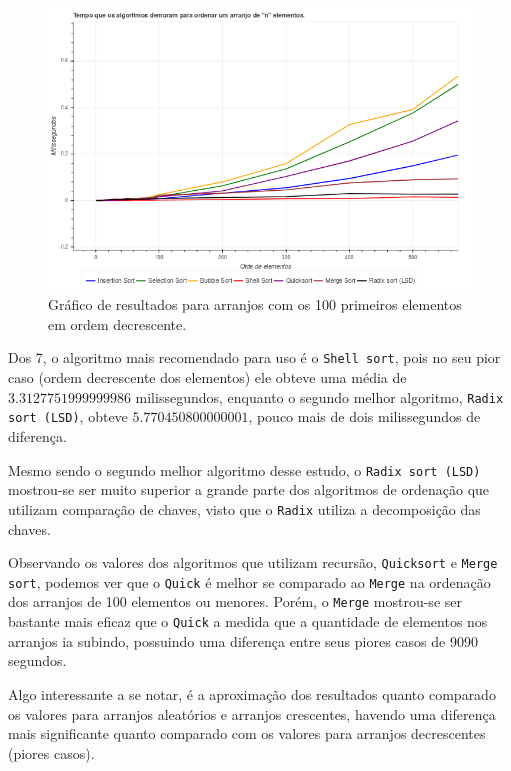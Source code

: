 \begin{figure}[H]
	\centering
	\includegraphics[scale=0.6]{img/igualdade/decrescentes.png}
	\caption{Gráfico de resultados para arranjos com os 100 primeiros elementos em ordem decrescente.}
	\label{graph-decrescente-comp}
\end{figure}

Dos 7, o algoritmo mais recomendado para uso é o \texttt{Shell sort}, pois no seu pior caso (ordem decrescente dos elementos) ele obteve uma média de $3.3127751999999986$ milissegundos, enquanto o segundo melhor algoritmo, \texttt{Radix sort (LSD)}, obteve $5.770450800000001$, pouco mais de dois milissegundos de diferença.

Mesmo sendo o segundo melhor algoritmo desse estudo, o \texttt{Radix sort (LSD)} mostrou-se ser muito superior a grande parte dos algoritmos de ordenação que utilizam comparação de chaves, visto que o \texttt{Radix} utiliza a decomposição das chaves.

Observando os valores dos algoritmos que utilizam recursão, \texttt{Quicksort} e \texttt{Merge sort}, podemos ver que o \texttt{Quick} é melhor se comparado ao \texttt{Merge} na ordenação dos arranjos de 100 elementos ou menores. Porém, o \texttt{Merge} mostrou-se ser bastante mais eficaz que o \texttt{Quick} a medida que a quantidade de elementos nos arranjos ia subindo, possuindo uma diferença entre seus piores casos de 9090 segundos.

Algo interessante a se notar, é a aproximação dos resultados quanto comparado os valores para arranjos aleatórios e arranjos crescentes, havendo uma diferença mais significante quanto comparado com os valores para arranjos decrescentes (piores casos).